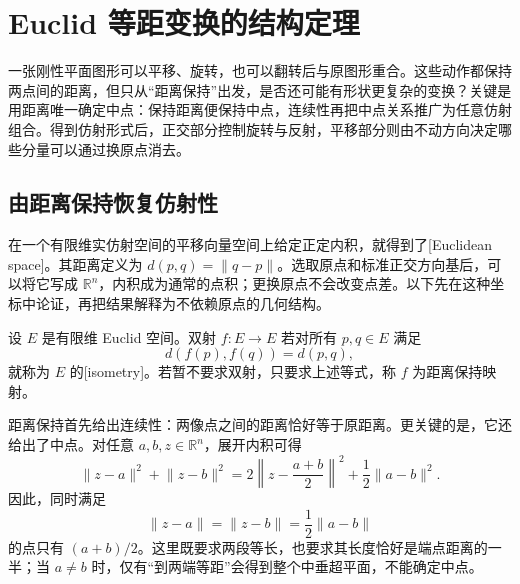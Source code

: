 
% 
% 
% 
% 

\section{Euclid 等距变换的结构定理}
\label{g1:sec:0103}

一张刚性平面图形可以平移、旋转，也可以翻转后与原图形重合。这些动作都保持两点间的距离，但只从“距离保持”出发，是否还可能有形状更复杂的变换？关键是用距离唯一确定中点：保持距离便保持中点，连续性再把中点关系推广为任意仿射组合。得到仿射形式后，正交部分控制旋转与反射，平移部分则由不动方向决定哪些分量可以通过换原点消去。

\subsection{由距离保持恢复仿射性}
\label{g1:subsec:0103:01}

在一个有限维实仿射空间的平移向量空间上给定正定内积，就得到了[Euclidean space]。其距离定义为 \(d(p,q)=\lVert q-p\rVert\)。选取原点和标准正交方向基后，可以将它写成 \(\mathbb R^n\)，内积成为通常的点积；更换原点不会改变点差。以下先在这种坐标中论证，再把结果解释为不依赖原点的几何结构。

\begin{definition}
	\label{g1:def:isometry}
	设 \(E\) 是有限维 Euclid 空间。双射 \(f\colon E\rightarrow E\) 若对所有 \(p,q\in E\) 满足
	\[
		d(f(p),f(q))=d(p,q),
	\]
	就称为 \(E\) 的[isometry]。若暂不要求双射，只要求上述等式，称 \(f\) 为距离保持映射。
\end{definition}

距离保持首先给出连续性：两像点之间的距离恰好等于原距离。更关键的是，它还给出了中点。对任意 \(a,b,z\in\mathbb R^n\)，展开内积可得
\[
	\lVert z-a\rVert^2+\lVert z-b\rVert^2
	=2\left\lVert z-\frac{a+b}{2}\right\rVert^2
	+\frac12\lVert a-b\rVert^2.
\]
因此，同时满足
\[
	\lVert z-a\rVert=\lVert z-b\rVert=\frac12\lVert a-b\rVert
\]
的点只有 \((a+b)/2\)。这里既要求两段等长，也要求其长度恰好是端点距离的一半；当 \(a\ne b\) 时，仅有“到两端等距”会得到整个中垂超平面，不能确定中点。

